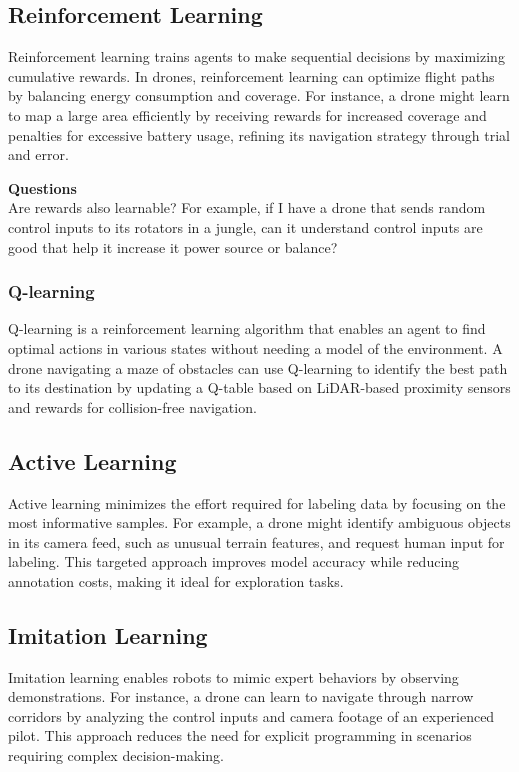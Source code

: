 \subsection{Reinforcement Learning}
Reinforcement learning trains agents to make sequential decisions by maximizing cumulative rewards. In drones, reinforcement learning can optimize flight paths by balancing energy consumption and coverage. For instance, a drone might learn to map a large area efficiently by receiving rewards for increased coverage and penalties for excessive battery usage, refining its navigation strategy through trial and error. 

\textbf{Questions}
\\
Are rewards also learnable? For example, if I have a drone that sends random control inputs to its rotators in a jungle, can it understand control inputs are good that help it increase it power source or balance?

\subsubsection{Q-learning}
Q-learning is a reinforcement learning algorithm that enables an agent to find optimal actions in various states without needing a model of the environment. A drone navigating a maze of obstacles can use Q-learning to identify the best path to its destination by updating a Q-table based on LiDAR-based proximity sensors and rewards for collision-free navigation.

\subsection{Active Learning}
Active learning minimizes the effort required for labeling data by focusing on the most informative samples. For example, a drone might identify ambiguous objects in its camera feed, such as unusual terrain features, and request human input for labeling. This targeted approach improves model accuracy while reducing annotation costs, making it ideal for exploration tasks. 

\subsection{Imitation Learning}
Imitation learning enables robots to mimic expert behaviors by observing demonstrations. For instance, a drone can learn to navigate through narrow corridors by analyzing the control inputs and camera footage of an experienced pilot. This approach reduces the need for explicit programming in scenarios requiring complex decision-making. 


